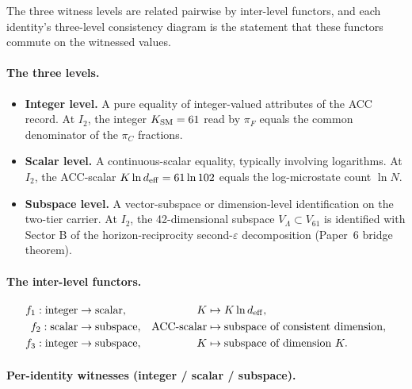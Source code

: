 \documentclass[11pt]{article}
\theoremstyle{plain}
\theoremstyle{definition}
\theoremstyle{remark}
\begin{document}
\bigskip

The three witness levels are related pairwise by inter-level functors, and each identity's three-level consistency diagram is the statement that these functors commute on the witnessed values.

\paragraph{The three levels.}
\begin{itemize}[leftmargin=2em,itemsep=3pt]
  \item \textbf{Integer level.}  A pure equality of integer-valued attributes of the ACC record.  At $I_2$, the integer $K_{\rm SM} = 61$ read by $\pi_F$ equals the common denominator of the $\pi_C$ fractions.
  \item \textbf{Scalar level.}  A continuous-scalar equality, typically involving logarithms.  At $I_2$, the ACC-scalar $K \ln d_{\rm eff} = 61 \ln 102$ equals the log-microstate count $\ln N$.
  \item \textbf{Subspace level.}  A vector-subspace or dimension-level identification on the two-tier carrier.  At $I_2$, the 42-dimensional subspace $V_\Lambda \subset V_{61}$ is identified with Sector B of the horizon-reciprocity second-$\varepsilon$ decomposition (Paper~6 bridge theorem).
\end{itemize}

\paragraph{The inter-level functors.}
\begin{align*}
  f_1 : \text{integer} &\to \text{scalar},  & K &\mapsto K \ln d_{\rm eff}, \\
  f_2 : \text{scalar}  &\to \text{subspace}, & \mathrm{ACC}\text{-scalar} &\mapsto \text{subspace of consistent dimension}, \\
  f_3 : \text{integer} &\to \text{subspace}, & K &\mapsto \text{subspace of dimension } K.
\end{align*}

\paragraph{Per-identity witnesses (integer / scalar / subspace).}
\end{document}

